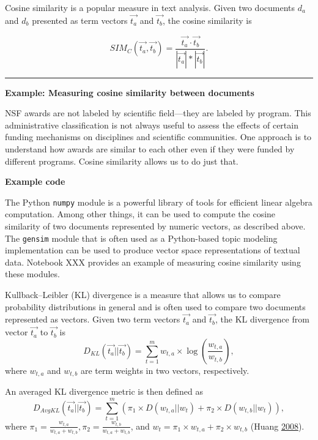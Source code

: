 \documentclass[]{krantz}
\begin{document}
Cosine similarity is a popular measure in text analysis. Given two
documents \(d_a\) and \(d_b\) presented as term vectors
\(\overrightarrow{t_a}\) and \(\overrightarrow{t_b}\), the cosine
similarity is

\[SIM_C(\overrightarrow{t_a},\overrightarrow{t_b}) = \frac{\overrightarrow{t_a} \cdot
     \overrightarrow{t_b}}{|\overrightarrow{t_a}|*|\overrightarrow{t_b}|}.\]

\begin{center}\rule{0.5\linewidth}{\linethickness}\end{center}

\textbf{Example: Measuring cosine similarity between documents}

NSF awards are not labeled by scientific field---they are labeled by
program. This administrative classification is not always useful to
assess the effects of certain funding mechanisms on disciplines and
scientific communities. One approach is to understand how awards are
similar to each other even if they were funded by different programs.
Cosine similarity allows us to do just that.

\textbf{Example code}

The Python \texttt{numpy} module is a powerful library of tools for
efficient linear algebra computation. Among other things, it can be used
to compute the cosine similarity of two documents represented by numeric
vectors, as described above. The \texttt{gensim} module that is often
used as a Python-based topic modeling implementation can be used to
produce vector space representations of textual data. Notebook XXX
provides an example of measuring cosine similarity using these modules.

Kullback--Leibler (KL) divergence is a measure that allows us to compare
probability distributions in general and is often used to compare two
documents represented as vectors. Given two term vectors
\(\overrightarrow{t_a}\) and \(\overrightarrow{t_b}\), the KL divergence
from vector \(\overrightarrow{t_a}\) to \(\overrightarrow{t_b}\) is
\[D_{KL}(\overrightarrow{t_a}||\overrightarrow{t_b}) = \sum\limits_{t=1}^m w_{t,a}\times \log\left(\frac{w_{t,a}}{w_{t,b}}\right),\]
where \(w_{t,a}\) and \(w_{t,b}\) are term weights in two vectors,
respectively.

An averaged KL divergence metric is then defined as
\[D_{AvgKL}(\overrightarrow{t_a}||\overrightarrow{t_b}) = \sum\limits_{t=1}^m (\pi_1\times D(w_{t,a}||w_t)+\pi_2\times D(w_{t,b}||w_t)),\]
where
\(\pi_1 = \frac{w_{t,a}}{w_{t,a}+w_{t,b}}, \pi_2 = \frac{w_{t,b}}{w_{t,a}+w_{t,b}}\),
and \(w_t = \pi_1\times w_{t,a} + \pi_2\times w_{t,b}\) (Huang
\protect\hyperlink{ref-huang-08}{2008}).
\end{document}
